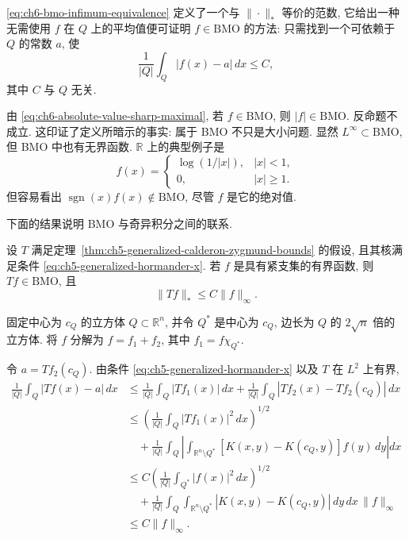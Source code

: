 \eqref{eq:ch6-bmo-infimum-equivalence} 定义了一个与 $\|\cdot\|_*$ 等价的范数, 它给出一种无需使用 $f$ 在 $Q$ 上的平均值便可证明 $f\in\mathrm{BMO}$ 的方法: 只需找到一个可依赖于 $Q$ 的常数 $a$, 使
\[
 \frac1{|Q|}\int_Q|f(x)-a|\,dx\le C,
\]
其中 $C$ 与 $Q$ 无关.

由 \eqref{eq:ch6-absolute-value-sharp-maximal}, 若 $f\in\mathrm{BMO}$, 则 $|f|\in\mathrm{BMO}$. 反命题不成立. 这印证了定义所暗示的事实: 属于 BMO 不只是大小问题. 显然 $L^\infty\subset\mathrm{BMO}$, 但 BMO 中也有无界函数. $\mathbb R$ 上的典型例子是
\[
 f(x)=
 \begin{cases}
  \log(1/|x|),&|x|<1,\\
  0,&|x|\ge1.
 \end{cases}
\]
但容易看出 $\operatorname{sgn}(x)f(x)\notin\mathrm{BMO}$, 尽管 $f$ 是它的绝对值.

下面的结果说明 BMO 与奇异积分之间的联系.

\begin{Theorem}
\label{thm:ch6-linfty-to-bmo}
设 $T$ 满足定理~\ref{thm:ch5-generalized-calderon-zygmund-bounds} 的假设, 且其核满足条件 \eqref{eq:ch5-generalized-hormander-x}. 若 $f$ 是具有紧支集的有界函数, 则 $Tf\in\mathrm{BMO}$, 且
\[
 \|Tf\|_*\le C\|f\|_\infty.
\]
\end{Theorem}

\begin{Proof}
固定中心为 $c_Q$ 的立方体 $Q\subset\mathbb R^n$, 并令 $Q^*$ 是中心为 $c_Q$, 边长为 $Q$ 的 $2\sqrt n$ 倍的立方体. 将 $f$ 分解为 $f=f_1+f_2$, 其中 $f_1=f\chi_{Q^*}$.

\hypertarget{chapter-06-page-131}{}
令 $a=Tf_2(c_Q)$. 由条件 \eqref{eq:ch5-generalized-hormander-x} 以及 $T$ 在 $L^2$ 上有界,
\[
\begin{aligned}
 \frac1{|Q|}\int_Q|Tf(x)-a|\,dx
 &\le\frac1{|Q|}\int_Q|Tf_1(x)|\,dx
 +\frac1{|Q|}\int_Q|Tf_2(x)-Tf_2(c_Q)|\,dx\\
 &\le\left(\frac1{|Q|}\int_Q|Tf_1(x)|^2\,dx\right)^{1/2}\\
 &\quad+\frac1{|Q|}\int_Q\left|\int_{\mathbb R^n\setminus Q^*}
 [K(x,y)-K(c_Q,y)]f(y)\,dy\right|dx\\
 &\le C\left(\frac1{|Q|}\int_{Q^*}|f(x)|^2\,dx\right)^{1/2}\\
 &\quad+\frac1{|Q|}\int_Q\int_{\mathbb R^n\setminus Q^*}
 |K(x,y)-K(c_Q,y)|\,dy\,dx\,\|f\|_\infty\\
 &\le C\|f\|_\infty.
\end{aligned}
\]
\end{Proof}

